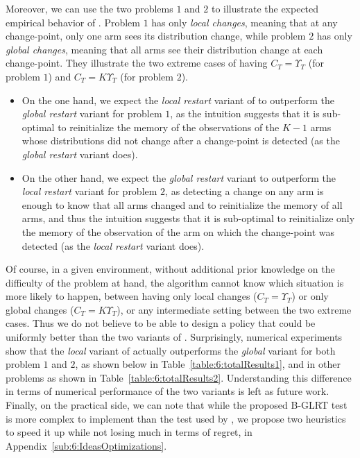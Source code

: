 Moreover, we can use the two problems $1$ and $2$ to illustrate the expected empirical behavior of \GLRklUCB.
Problem $1$ has only \emph{local changes}, meaning that at any change-point, only one arm sees its distribution change, while problem $2$ has only \emph{global changes}, meaning that all arms see their distribution change at each change-point.
They illustrate the two extreme cases of having $C_T = \Upsilon_T$ (for problem $1$) and $C_T = K \Upsilon_T$ (for problem $2$).
\begin{itemize}
    \item
On the one hand, we expect the \emph{local restart} variant of \GLRklUCB{} to outperform the \emph{global restart} variant for problem $1$, as the intuition suggests that it is sub-optimal to reinitialize the memory of the observations of the $K-1$ arms whose distributions did not change after a change-point is detected (as the \emph{global restart} variant does).
    \item
On the other hand, we expect the \emph{global restart} variant to outperform the \emph{local restart} variant for problem $2$, as detecting a change on any arm is enough to know that all arms changed and to reinitialize the memory of all arms, and thus the intuition suggests that it is sub-optimal to reinitialize only the memory of the observation of the arm on which the change-point was detected (as the \emph{local restart} variant does).
\end{itemize}
%
Of course, in a given environment, without additional prior knowledge on the difficulty of the problem at hand, the algorithm cannot know which situation is more likely to happen, between having only local changes ($C_T = \Upsilon_T$) or only global changes ($C_T = K \Upsilon_T$), or any intermediate setting between the two extreme cases.
Thus we do not believe to be able to design a policy that could be uniformly better than the two variants of \GLRklUCB.
%
Surprisingly, numerical experiments show that the \emph{local} variant of \GLRklUCB{} actually outperforms the \emph{global} variant for both problem $1$ and $2$, as shown below in Table~\ref{table:6:totalResults1}, and in other problems as shown in Table~\ref{table:6:totalResults2}.
%
Understanding this difference in terms of numerical performance of the two variants is left as future work.
%
Finally, on the practical side, we can note that while the proposed B-GLRT test is more complex to implement than the test used by \MUCB, we propose two heuristics to speed it up while not losing much in terms of regret, in Appendix~\ref{sub:6:IdeasOptimizations}.


